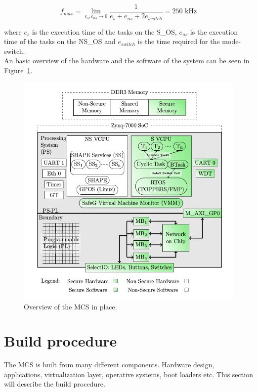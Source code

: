 $$f_{max} = \lim_{e_s, e_{ns} \to 0} \frac{1}{e_s+e_{ns}+2e_{switch}} = 250\textrm{ kHz}$$

where $e_s$ is the execution time of the tasks on the S\_OS, $e_{ns}$ is the execution time of the tasks on the NS\_OS and $e_{switch}$ is the time required for the mode-switch.\\

An basic overview of the hardware and the software of the system can be seen in Figure~\ref{fig:system_overview}.

\begin{figure}[H]
\centering
\includegraphics[width=\textwidth]{./img/literature_overview.png}
\caption{Overview of the MCS in place.\cite{zaki2016}}\label{fig:system_overview}
\end{figure}

\section{Build procedure}
The MCS is built from many different components. Hardware design,  applications, virtualization layer, operative systems, boot loaders etc. This section will describe the build procedure.\\ %

